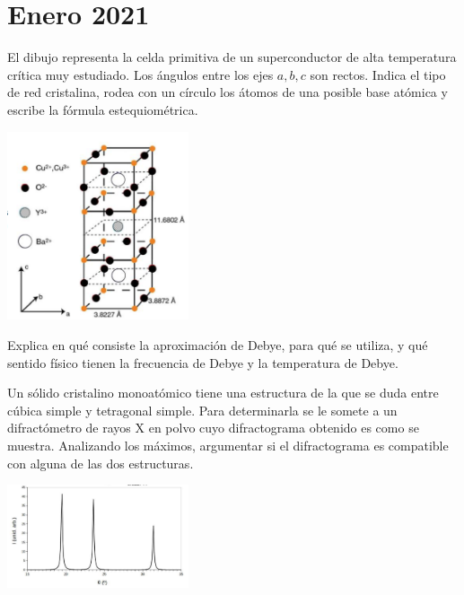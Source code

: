 \section*{Enero 2021}
\setcounter{section}{2} %

\begin{ejercicio}
	El dibujo representa la celda primitiva de un superconductor de alta temperatura crítica muy estudiado. Los ángulos entre los ejes $a,b,c$ son rectos. Indica el tipo de red cristalina, rodea con un círculo los átomos de una posible base atómica y escribe la fórmula estequiométrica. 
	
	\begin{center}
		\includegraphics[width=0.4\textwidth]{Imagenes/Enero_2021_01.png}
	\end{center}
	
	
	
\end{ejercicio}

\begin{ejercicio}
	Explica en qué consiste la aproximación de Debye, para qué se utiliza, y qué sentido físico tienen la frecuencia de Debye y la temperatura de Debye.
\end{ejercicio}

\begin{ejercicio}
	Un sólido cristalino monoatómico tiene una estructura de la que se duda entre cúbica simple y tetragonal simple. Para determinarla se le somete a un difractómetro de rayos X en polvo cuyo difractograma obtenido es como se muestra. Analizando los máximos, argumentar si el difractograma es compatible con alguna de las dos estructuras.
	
	\begin{center}
		\includegraphics[width=0.4\textwidth]{Imagenes/Enero_2021_02.png}
	\end{center}
	
\end{ejercicio}

